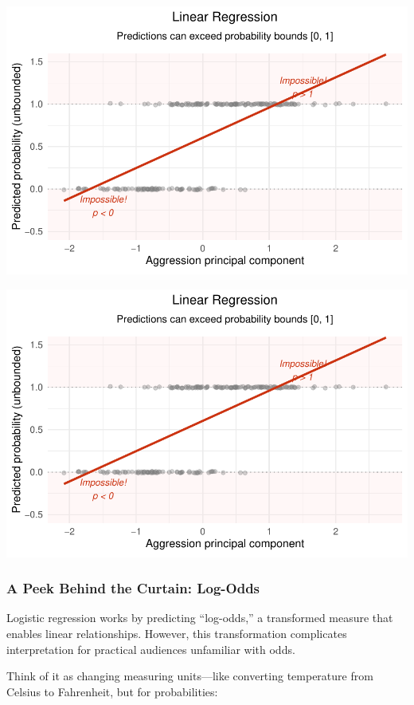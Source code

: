 \documentclass[
  letterpaper,
  DIV=11,
  numbers=noendperiod]{scrartcl}
\begin{document}
\begin{center}
\includegraphics[width=0.8\linewidth,height=\textheight,keepaspectratio]{Beyond!!!_files/figure-pdf/unnamed-chunk-4-99.pdf}
\end{center}

\begin{center}
\includegraphics[width=0.8\linewidth,height=\textheight,keepaspectratio]{Beyond!!!_files/figure-pdf/unnamed-chunk-4-100.pdf}
\end{center}

\subsubsection{A Peek Behind the Curtain:
Log-Odds}\label{a-peek-behind-the-curtain-log-odds}

Logistic regression works by predicting ``log-odds,'' a transformed
measure that enables linear relationships. However, this transformation
complicates interpretation for practical audiences unfamiliar with odds.

Think of it as changing measuring units---like converting temperature
from Celsius to Fahrenheit, but for probabilities:
\end{document}
